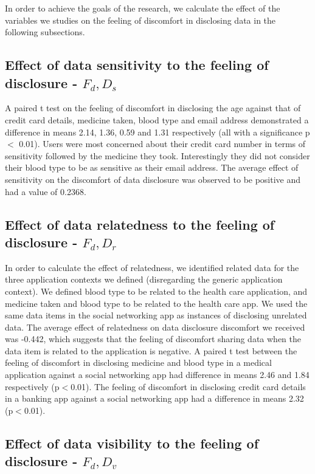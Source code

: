 \documentclass[conference]{IEEEtran}
\begin{document}
In order to achieve the goals of the research, we calculate the effect of the variables we studies on the feeling of discomfort in disclosing data in the following subsections.

\subsection{Effect of data sensitivity to the feeling of disclosure -  $F_d,D_s$}

A paired t test on the feeling of discomfort in disclosing the age against that of credit card details, medicine taken, blood type and email address demonstrated a difference in means 2.14, 1.36, 0.59 and 1.31 respectively (all with a significance p$<$ 0.01). Users were most concerned about their credit card number in terms of sensitivity followed by the medicine they took. Interestingly they did not consider their blood type to be as sensitive as their email address. The average effect of sensitivity on the discomfort of data disclosure was observed to be positive and had a value of 0.2368.


\subsection{Effect of data relatedness to the feeling of disclosure -  $F_d,D_r$}

In order to calculate the effect of relatedness, we identified related data for the three application contexts we defined (disregarding the generic application context). We defined blood type to be related to the health care application, and medicine taken and blood type to be related to the health care app. We used the same data items in the social networking app as instances of disclosing unrelated data. The average effect of relatedness on data disclosure discomfort we received was -0.442, which suggests that the feeling of discomfort sharing data when the data item is related to the application is negative. A paired t test between the feeling of discomfort in disclosing medicine and blood type in a medical application against a social networking app had difference in means 2.46 and 1.84 respectively (p$<$0.01). The feeling of discomfort in disclosing credit card details in a banking app against a social networking app had a difference in means 2.32 (p$<$0.01). 

\subsection{Effect of data visibility to the feeling of disclosure -  $F_d,D_v$}
\end{document}
